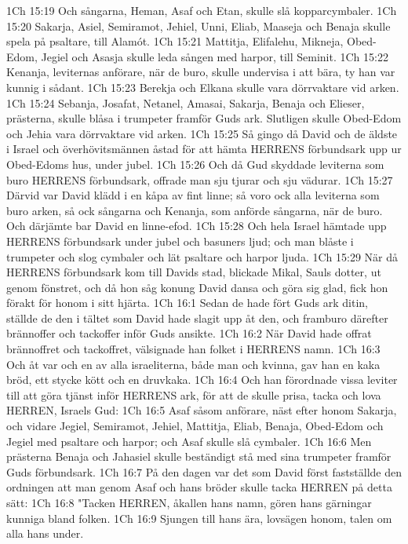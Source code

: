 1Ch 15:19  Och sångarna, Heman, Asaf och Etan, skulle slå kopparcymbaler.
1Ch 15:20  Sakarja, Asiel, Semiramot, Jehiel, Unni, Eliab, Maaseja och Benaja skulle spela på psaltare, till Alamót.
1Ch 15:21  Mattitja, Elifalehu, Mikneja, Obed-Edom, Jegiel och Asasja skulle leda sången med harpor, till Seminit.
1Ch 15:22  Kenanja, leviternas anförare, när de buro, skulle undervisa i att bära, ty han var kunnig i sådant.
1Ch 15:23  Berekja och Elkana skulle vara dörrvaktare vid arken.
1Ch 15:24  Sebanja, Josafat, Netanel, Amasai, Sakarja, Benaja och Elieser, prästerna, skulle blåsa i trumpeter framför Guds ark. Slutligen skulle Obed-Edom och Jehia vara dörrvaktare vid arken.
1Ch 15:25  Så gingo då David och de äldste i Israel och överhövitsmännen åstad för att hämta HERRENS förbundsark upp ur Obed-Edoms hus, under jubel.
1Ch 15:26  Och då Gud skyddade leviterna som buro HERRENS förbundsark, offrade man sju tjurar och sju vädurar.
1Ch 15:27  Därvid var David klädd i en kåpa av fint linne; så voro ock alla leviterna som buro arken, så ock sångarna och Kenanja, som anförde sångarna, när de buro. Och därjämte bar David en linne-efod.
1Ch 15:28  Och hela Israel hämtade upp HERRENS förbundsark under jubel och basuners ljud; och man blåste i trumpeter och slog cymbaler och lät psaltare och harpor ljuda.
1Ch 15:29  När då HERRENS förbundsark kom till Davids stad, blickade Mikal, Sauls dotter, ut genom fönstret, och då hon såg konung David dansa och göra sig glad, fick hon förakt för honom i sitt hjärta.
1Ch 16:1  Sedan de hade fört Guds ark ditin, ställde de den i tältet som David hade slagit upp åt den, och framburo därefter brännoffer och tackoffer inför Guds ansikte.
1Ch 16:2  När David hade offrat brännoffret och tackoffret, välsignade han folket i HERRENS namn.
1Ch 16:3  Och åt var och en av alla israeliterna, både man och kvinna, gav han en kaka bröd, ett stycke kött och en druvkaka.
1Ch 16:4  Och han förordnade vissa leviter till att göra tjänst inför HERRENS ark, för att de skulle prisa, tacka och lova HERREN, Israels Gud:
1Ch 16:5  Asaf såsom anförare, näst efter honom Sakarja, och vidare Jegiel, Semiramot, Jehiel, Mattitja, Eliab, Benaja, Obed-Edom och Jegiel med psaltare och harpor; och Asaf skulle slå cymbaler.
1Ch 16:6  Men prästerna Benaja och Jahasiel skulle beständigt stå med sina trumpeter framför Guds förbundsark.
1Ch 16:7  På den dagen var det som David först fastställde den ordningen att man genom Asaf och hans bröder skulle tacka HERREN på detta sätt:
1Ch 16:8  "Tacken HERREN, åkallen hans namn, gören hans gärningar kunniga bland folken.
1Ch 16:9  Sjungen till hans ära, lovsägen honom, talen om alla hans under.
